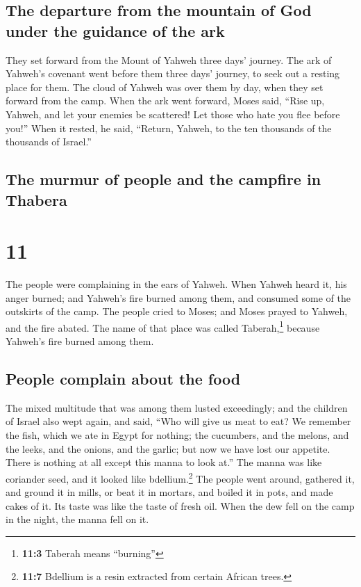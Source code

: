 \hypertarget{the-departure-from-the-mountain-of-god-under-the-guidance-of-the-ark}{%
\subsection{The departure from the mountain of God under the guidance of
the
ark}\label{the-departure-from-the-mountain-of-god-under-the-guidance-of-the-ark}}

 They set forward from the Mount of Yahweh three days'
journey. The ark of Yahweh's covenant went before them three days'
journey, to seek out a resting place for them.  The cloud
of Yahweh was over them by day, when they set forward from the camp.
 When the ark went forward, Moses said, ``Rise up,
Yahweh, and let your enemies be scattered! Let those who hate you flee
before you!''  When it rested, he said, ``Return, Yahweh,
to the ten thousands of the thousands of Israel.''

\hypertarget{the-murmur-of-people-and-the-campfire-in-thabera}{%
\subsection{The murmur of people and the campfire in
Thabera}\label{the-murmur-of-people-and-the-campfire-in-thabera}}

\hypertarget{section-10}{%
\section{11}\label{section-10}}

 The people were complaining in the ears of Yahweh. When
Yahweh heard it, his anger burned; and Yahweh's fire burned among them,
and consumed some of the outskirts of the camp.  The
people cried to Moses; and Moses prayed to Yahweh, and the fire abated.
 The name of that place was called Taberah,\footnote{\textbf{11:3}
  Taberah means ``burning''} because Yahweh's fire burned among them.

\hypertarget{people-complain-about-the-food}{%
\subsection{People complain about the
food}\label{people-complain-about-the-food}}

 The mixed multitude that was among them lusted
exceedingly; and the children of Israel also wept again, and said, ``Who
will give us meat to eat?  We remember the fish, which we
ate in Egypt for nothing; the cucumbers, and the melons, and the leeks,
and the onions, and the garlic;  but now we have lost our
appetite. There is nothing at all except this manna to look at.''
 The manna was like coriander seed, and it looked like
bdellium.\footnote{\textbf{11:7} Bdellium is a resin extracted from
  certain African trees.}  The people went around,
gathered it, and ground it in mills, or beat it in mortars, and boiled
it in pots, and made cakes of it. Its taste was like the taste of fresh
oil.  When the dew fell on the camp in the night, the
manna fell on it.

